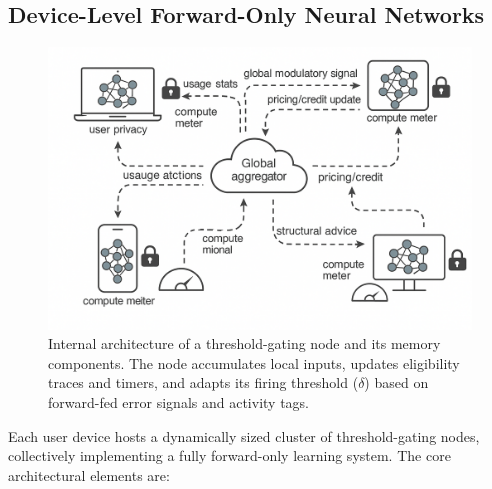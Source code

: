 \documentclass[11pt]{article}
\begin{document}
\subsection{Device-Level Forward-Only Neural Networks}
\begin{figure}[ht]
    \centering
    \includegraphics[width=0.68\linewidth]{architecture_diagrams/48db0a56-63a0-40ef-9322-787cc6e465d9.png}
    \caption{
        Internal architecture of a threshold-gating node and its memory components. The node accumulates local inputs, updates eligibility traces and timers, and adapts its firing threshold (\(\delta\)) based on forward-fed error signals and activity tags.
    }
    \label{fig:node-internal-architecture}
\end{figure}

Each user device hosts a dynamically sized cluster of threshold-gating nodes, collectively implementing a fully forward-only learning system. The core architectural elements are:
\end{document}
